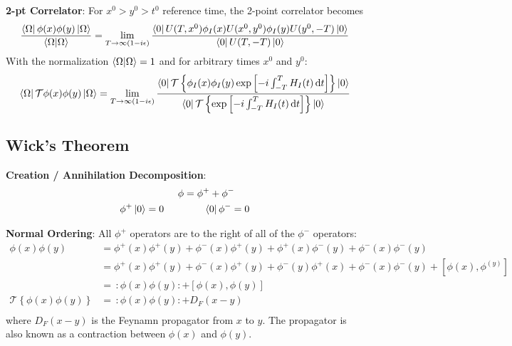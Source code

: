 \documentclass[12pt]{article}
\newcommand{\diff}{\mathop{}\!\mathrm{d}}
\newcommand{\normord}[1]{:\mathrel{#1}:}
\theoremstyle{definition}
\begin{document}
\textbf{2-pt Correlator}:
For $x^0 > y^0 > t^0$ reference time, the 2-point correlator becomes
\begin{equation*}
    \frac{\bra{\Omega}\phi(x) \phi(y) \ket{\Omega}}{\braket{\Omega|\Omega} }
    = \lim_{T \to \infty(1-i\epsilon)} \frac{\bra{0}U(T,x^0) \phi_I(x) U(x^0, y^0) \phi_I(y) U(y^0, -T)\ket{0}}{\bra{0}U(T,-T)\ket{0}}
\end{equation*}
With the normalization $\braket{\Omega|\Omega} = 1$ and for arbitrary times $x^0$ and $y^0$:
\begin{equation*}
    \bra{\Omega}\mathcal{T} \phi(x) \phi(y) \ket{\Omega}
    =
    \lim_{T \to \infty(1-i\epsilon)} \frac{\bra{0}\mathcal{T}\left\{\phi_I(x) \phi_I(y) \exp\left[ -i\int_{-T}^T H_I(t) \diff t \right] \right\}\ket{0}}{\bra{0} \mathcal{T} \left\{ \exp \left[ -i\int_{-T}^T H_I(t) \diff t \right] \right\} \ket{0} }
\end{equation*}

\subsection{Wick's Theorem}

\textbf{Creation / Annihilation Decomposition}:
\begin{equation*}
\begin{split}
    \phi &= \phi^+ + \phi^- \\
    \phi^+ \ket{0} = 0 \qquad & \qquad \bra{0} \phi^- = 0 \\
\end{split}
\end{equation*}

\textbf{Normal Ordering}: All $\phi^+$ operators are to the right of all of the $\phi^-$ operators:
\begin{equation*}
\begin{split}
    \phi(x)\phi(y)
        &= \phi^+(x) \phi^+(y) + \phi^-(x) \phi^+(y) + \phi^+(x) \phi^-(y) + \phi^-(x) \phi^-(y) \\
        &= \phi^+(x) \phi^+(y) + \phi^-(x) \phi^+(y) + \phi^-(y) \phi^+(x) + \phi^-(x) \phi^-(y) + [\phi(x), \phi^(y)] \\
        &= \, \normord{\phi(x)\phi(y)} + [\phi(x), \phi(y)] \\
    \mathcal{T} \left\{ \phi(x) \phi(y) \right\} &= \, \normord{\phi(x)\phi(y)} + D_F(x - y) \\
\end{split}
\end{equation*}
where $D_F(x - y)$ is the Feynamn propagator from $x$ to $y$. The propagator is also known as a contraction
between $\phi(x)$ and $\phi(y)$.
\end{document}
